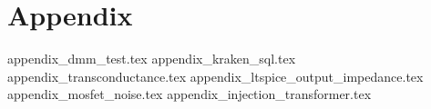 \documentclass[12pt]{book}
\begin{document}
    \appendix  %
    \chapter{Appendix}
        {appendix_dmm_test.tex}
        \clearpage
        {appendix_kraken_sql.tex}
        \clearpage
        {appendix_transconductance.tex}
        \clearpage
        {appendix_ltspice_output_impedance.tex}
        \clearpage
        {appendix_mosfet_noise.tex}
        \clearpage
        {appendix_injection_transformer.tex}
\end{document}

